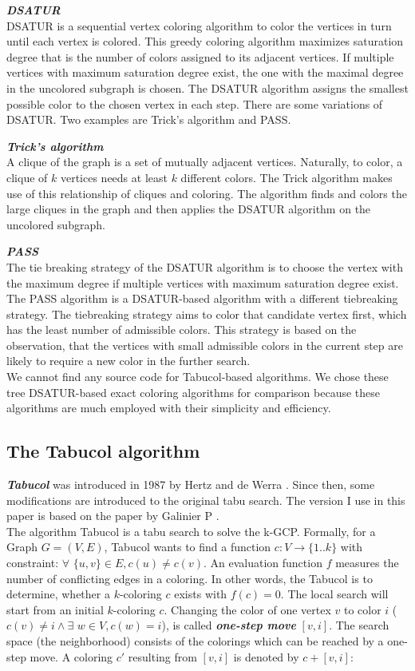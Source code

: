 \documentclass[12pt,a4paper,twoside]{scrartcl}
\numberwithin{equation}{section}
\begin{document}
\emph{\textbf{DSATUR}} \cite{brelaz1979new}\\
DSATUR is a sequential vertex coloring algorithm to color the vertices in turn until each vertex is colored. This greedy coloring algorithm maximizes saturation degree that is the number of colors assigned to its adjacent vertices. If multiple vertices with maximum saturation degree exist, the one with the maximal degree in the uncolored subgraph is chosen. The DSATUR algorithm assigns the smallest possible color to the chosen vertex in each step.
There are some variations of DSATUR. Two examples are Trick's algorithm and PASS.

\emph{\textbf{Trick's algorithm}} \cite{Trickalgorithm}\\
A clique of the graph is a set of mutually adjacent vertices. Naturally, to color, a clique of $k$ vertices needs at least $k$ different colors. The Trick algorithm makes use of this relationship of cliques and coloring. The algorithm finds and colors the large cliques in the graph and then applies the DSATUR algorithm on the uncolored subgraph.

\emph{\textbf{PASS}} \cite{san2012new}\\
The tie breaking strategy of the DSATUR algorithm is to choose the vertex with the maximum degree if multiple vertices with maximum saturation degree exist. The PASS algorithm is a DSATUR-based algorithm with a different tiebreaking strategy. The tiebreaking strategy aims to color that candidate vertex first, which has the least number of admissible colors. This strategy is based on the observation, that the vertices with small admissible colors in the current step are likely to require a new color in the further search.\\

We cannot find any source code for Tabucol-based algorithms. We chose these tree DSATUR-based exact coloring algorithms for comparison because these algorithms are much employed with their simplicity and efficiency.
\subsection{The Tabucol algorithm}
\emph{\textbf{Tabucol}} was introduced in 1987 by Hertz and de Werra \cite{hertz1987using}. Since then, some modifications are introduced to the original tabu search. The version I use in this paper is based on the paper by Galinier P \cite{galinier2006survey}. \\
The algorithm Tabucol is a tabu search to solve the k-GCP. Formally, for a Graph $G = (V, E)$, Tabucol wants to find a function $c: V\rightarrow\{1..k\}$ with constraint: $\forall$ $\{u, v\}\in E, c(u)\neq c(v)$. An evaluation function $f$ measures the number of conflicting edges in a coloring. In other words, the Tabucol is to determine, whether a $k$-coloring $c$ exists with $f(c) =0$. The local search will start from an initial $k$-coloring $c$. Changing the color of one vertex $v$ to color $i$ ($c(v) \neq i \land \exists$ $ w \in V, c(w) = i$), is called \emph{\textbf{one-step move}} $[v, i]$. The search space (the neighborhood) consists of the colorings which can be reached by a one-step move. A coloring $c'$ resulting from  $[v, i]$ is denoted by $c+[v, i]$:
\end{document}
